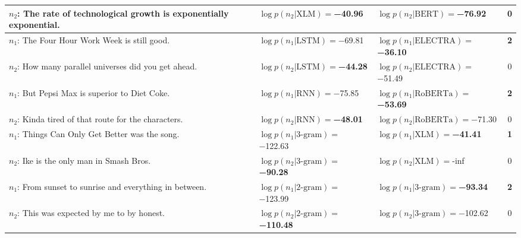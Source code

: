 \begin{tabularx}{\textwidth}{lllc}
 $n_2$: The rate of technological growth is exponentially exponential. &      $\log p(n_2 | \textrm{XLM})=$\textbf{\num{-40.96}} &              $\log p(n_2 | \textrm{BERT})=$\num{-76.92} &           \num{0} \\\midrule
                         $n_1$: The Four Hour Work Week is still good. &              $\log p(n_1 | \textrm{LSTM})=$\num{-69.81} &  $\log p(n_1 | \textrm{ELECTRA})=$\textbf{\num{-36.10}} &  \textbf{\num{2}} \\
                 $n_2$: How many parallel universes did you get ahead. &     $\log p(n_2 | \textrm{LSTM})=$\textbf{\num{-44.28}} &           $\log p(n_2 | \textrm{ELECTRA})=$\num{-51.49} &           \num{0} \\\midrule
                        $n_1$: But Pepsi Max is superior to Diet Coke. &               $\log p(n_1 | \textrm{RNN})=$\num{-75.85} &  $\log p(n_1 | \textrm{RoBERTa})=$\textbf{\num{-53.69}} &  \textbf{\num{2}} \\
                  $n_2$: Kinda tired of that route for the characters. &      $\log p(n_2 | \textrm{RNN})=$\textbf{\num{-48.01}} &           $\log p(n_2 | \textrm{RoBERTa})=$\num{-71.30} &           \num{0} \\\midrule
                       $n_1$: Things Can Only Get Better was the song. &           $\log p(n_1 | \textrm{3-gram})=$\num{-122.63} &      $\log p(n_1 | \textrm{XLM})=$\textbf{\num{-41.41}} &  \textbf{\num{1}} \\
                             $n_2$: Ike is the only man in Smash Bros. &   $\log p(n_2 | \textrm{3-gram})=$\textbf{\num{-90.28}} &                 $\log p(n_2 | \textrm{XLM})=$\num{-inf} &           \num{0} \\\midrule
              $n_1$: From sunset to sunrise and everything in between. &           $\log p(n_1 | \textrm{2-gram})=$\num{-123.99} &   $\log p(n_1 | \textrm{3-gram})=$\textbf{\num{-93.34}} &  \textbf{\num{2}} \\
                          $n_2$: This was expected by me to by honest. &  $\log p(n_2 | \textrm{2-gram})=$\textbf{\num{-110.48}} &           $\log p(n_2 | \textrm{3-gram})=$\num{-102.62} &           \num{0} \\
\bottomrule
\end{tabularx}
